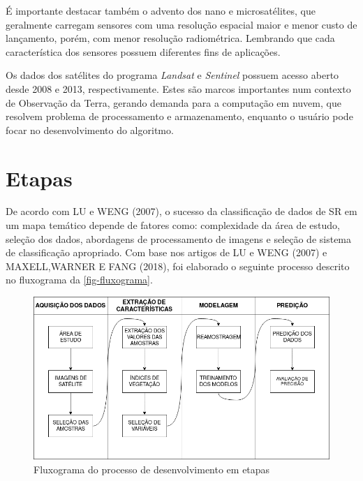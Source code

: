 É importante destacar também o advento dos nano e microsatélites, que
geralmente carregam sensores com uma resolução espacial maior e menor
custo de lançamento, porém, com menor resolução radiométrica. Lembrando
que cada característica dos sensores possuem diferentes fins de
aplicações.

Os dados dos satélites do programa \emph{Landsat} e \emph{Sentinel}
possuem acesso aberto desde 2008 e 2013, respectivamente. Estes são
marcos importantes num contexto de Observação da Terra, gerando demanda para a computação em nuvem, que resolvem problema de processamento e
armazenamento, enquanto o usuário pode focar no desenvolvimento do
algoritmo. \cite{wulder2014satellites}

\section{Etapas}\label{etapas}

	De acordo com LU e WENG (2007)\cite{lu-weng}, o sucesso da classificação de dados de SR em
um mapa temático depende de fatores como: complexidade da área de
estudo, seleção dos dados, abordagens de processamento de imagens e
seleção de sistema de classificação apropriado. Com base nos artigos de LU e WENG (2007) e MAXELL,WARNER E FANG (2018), foi elaborado o seguinte processo descrito no fluxograma da \autoref{fig-fluxograma}.

\begin{figure}[htbp]
    \centering
    \caption{Fluxograma do processo de desenvolvimento em etapas} \label{fig-fluxograma}
    \includegraphics[scale=0.55]{figs/etapas.png}
\end{figure}
